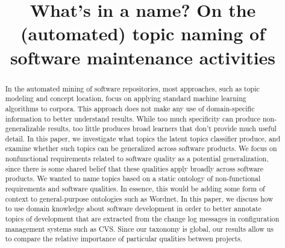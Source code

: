 \documentclass[10pt, conference, compsocconf]{IEEEtran}
\begin{document}
 
\author{
\and
{}
}

\title{What's in a name? On the (automated) topic naming of software maintenance activities}

\maketitle
\thispagestyle{empty}

\begin{abstract}
  In the automated mining of software repositories, most approaches, such as topic modeling and concept location, focus on applying standard machine learning algorithms to corpora. This approach does not make any use of domain-specific information to better understand results. While too much specificity can produce non-generalizable results, too little produces broad learners that don't provide much useful detail.%
In this paper, we investigate what topics the latent topics classifier produce, and examine  whether such topics can be
  generalized across software products. We focus on nonfunctional requirements related to software quality
  as a potential generalization, since there is some shared belief
  that these qualities apply broadly across software products. We
  wanted to name topics based on a static ontology of non-functional
  requirements and software qualities. %
In essence, this would be adding some form
  of context to general-purpose ontologies such as Wordnet. In this
  paper, we discuss how to use domain knowledge about software
  development in order to better annotate topics of development that
  are extracted from the change log messages in configuration
  management systems such as CVS. Since our taxonomy is global, our results allow us to compare the relative importance of particular qualities between projects.
\end{abstract}
\end{document}
